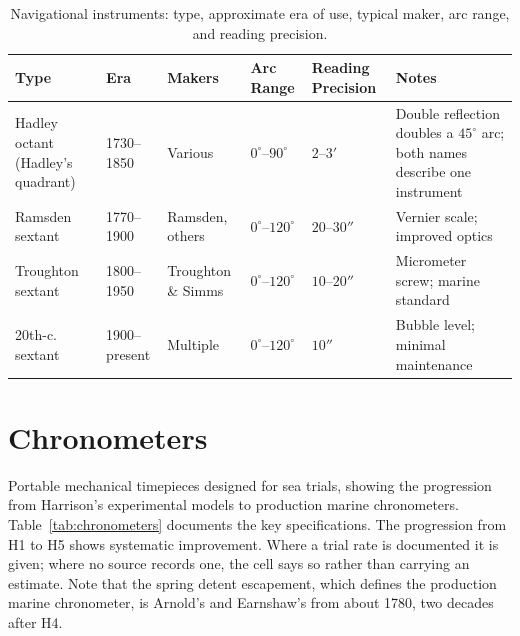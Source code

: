 \begin{table}
  \centering
  \caption{Navigational instruments: type, approximate era of use, typical maker, arc range, and reading precision.}
  \label{tab:navigation-instruments}
  \begin{tabularx}{\linewidth}{llXlXX}
    \toprule
    \textbf{Type} & \textbf{Era} & \textbf{Makers} & \textbf{Arc Range} & \textbf{Reading Precision} & \textbf{Notes} \\
    \midrule
    Hadley octant (Hadley's quadrant) & 1730--1850 & Various & $0^{\circ} – 90^{\circ}$ & $2–3'$ & Double reflection doubles a $45^{\circ}$ arc; both names describe one instrument \\
    Ramsden sextant & 1770--1900 & Ramsden, others & $0^{\circ} – 120^{\circ}$ & $20–30''$ & Vernier scale; improved optics \\
    Troughton sextant & 1800--1950 & Troughton \& Simms & $0^{\circ} – 120^{\circ}$ & $10–20''$ & Micrometer screw; marine standard \\
    20th-c. sextant & 1900–present & Multiple & $0^{\circ} – 120^{\circ}$ & $10''$ & Bubble level; minimal maintenance \\
    \bottomrule
  \end{tabularx}
\end{table}

\section{Chronometers}

Portable mechanical timepieces designed for sea trials, showing the progression from Harrison's experimental models to production marine chronometers. Table~\ref{tab:chronometers} documents the key specifications. The progression from H1 to H5 shows systematic improvement. Where a trial rate is documented it is given; where no source records one, the cell says so rather than carrying an estimate. Note that the spring detent escapement, which defines the production marine chronometer, is Arnold's and Earnshaw's from about 1780, two decades after H4.


